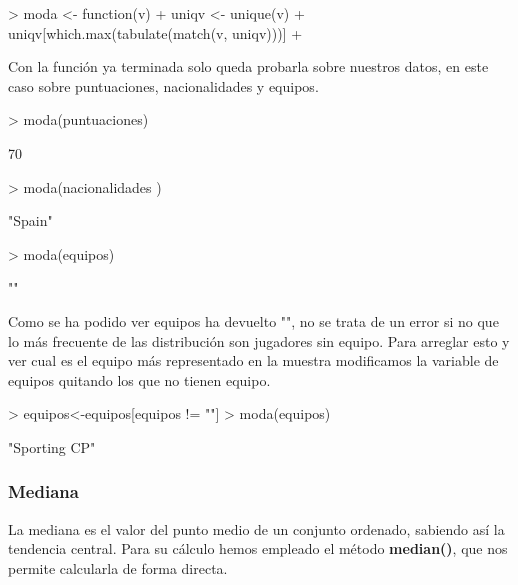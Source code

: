 \documentclass [a4paper] {article}
\begin{document}
\begin{Schunk}
\begin{Sinput}
> moda <- function(v) {
+    uniqv <- unique(v)
+    uniqv[which.max(tabulate(match(v, uniqv)))]
+ }
\end{Sinput}
\end{Schunk}

Con la función ya terminada solo queda probarla sobre nuestros datos, en este caso sobre puntuaciones, nacionalidades y equipos.

\begin{Schunk}
\begin{Sinput}
> moda(puntuaciones)
\end{Sinput}
\begin{Soutput}
[1] 70
\end{Soutput}
\begin{Sinput}
> moda(nacionalidades )
\end{Sinput}
\begin{Soutput}
[1] "Spain"
\end{Soutput}
\begin{Sinput}
> moda(equipos)
\end{Sinput}
\begin{Soutput}
[1] ""
\end{Soutput}
\end{Schunk}

Como se ha podido ver equipos ha devuelto "", no se trata de un error si no que lo más frecuente de las distribución son jugadores sin equipo. Para arreglar esto
y ver cual es el equipo más representado en la muestra modificamos la variable de equipos quitando los que no tienen equipo.

\begin{Schunk}
\begin{Sinput}
> equipos<-equipos[equipos != ""]
> moda(equipos)
\end{Sinput}
\begin{Soutput}
[1] "Sporting CP"
\end{Soutput}
\end{Schunk}

\subsubsection{ Mediana}
La mediana es el valor del punto medio de un conjunto ordenado, sabiendo así la tendencia central. Para su cálculo hemos empleado el método
\textbf{median()}, que nos permite calcularla de forma directa.
\end{document}
